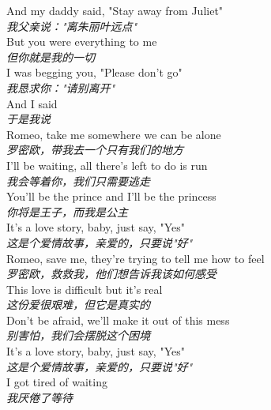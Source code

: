 \begin{spacing}{1.5}
\begin{flushleft}
And my daddy said, "Stay away from Juliet"\\
\textit{我父亲说："离朱丽叶远点"}\\[0.5em]

But you were everything to me\\
\textit{但你就是我的一切}\\[0.5em]

I was begging you, "Please don't go"\\
\textit{我恳求你："请别离开"}\\[0.5em]

And I said\\
\textit{于是我说}\\[0.5em]

Romeo, take me somewhere we can be alone\\
\textit{罗密欧，带我去一个只有我们的地方}\\[0.5em]

I'll be waiting, all there's left to do is run\\
\textit{我会等着你，我们只需要逃走}\\[0.5em]

You'll be the prince and I'll be the princess\\
\textit{你将是王子，而我是公主}\\[0.5em]

It's a love story, baby, just say, "Yes"\\
\textit{这是个爱情故事，亲爱的，只要说"好"}\\[0.5em]

Romeo, save me, they're trying to tell me how to feel\\
\textit{罗密欧，救救我，他们想告诉我该如何感受}\\[0.5em]

This love is difficult but it's real\\
\textit{这份爱很艰难，但它是真实的}\\[0.5em]

Don't be afraid, we'll make it out of this mess\\
\textit{别害怕，我们会摆脱这个困境}\\[0.5em]

It's a love story, baby, just say, "Yes"\\
\textit{这是个爱情故事，亲爱的，只要说"好"}\\[0.5em]

I got tired of waiting\\
\textit{我厌倦了等待}\\[0.5em]


\end{flushleft}
\end{spacing}
